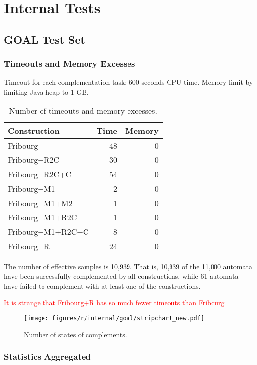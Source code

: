 \section{Internal Tests}

\subsection{GOAL Test Set}

\subsubsection{Timeouts and Memory Excesses}

Timeout for each complementation task: 600 seconds CPU time. Memory limit by limiting Java heap to 1 GB.

\begin{table}[ht]
\centering
\begin{tabular}{lrr}
  \hline
Construction & Time & Memory \\ 
  \hline
Fribourg & 48 & 0 \\ 
  Fribourg+R2C & 30 & 0 \\ 
  Fribourg+R2C+C & 54 & 0 \\ 
  Fribourg+M1 & 2 & 0 \\ 
  Fribourg+M1+M2 & 1 & 0 \\ 
  Fribourg+M1+R2C & 1 & 0 \\ 
  Fribourg+M1+R2C+C & 8 & 0 \\ 
  Fribourg+R & 24 & 0 \\ 
   \hline
\end{tabular}
\caption{Number of timeouts and memory excesses.}
\end{table}


The number of effective samples is 10,939. That is, 10,939 of the 11,000 automata have been successfully complemented by all constructions, while 61 automata have failed to complement with at least one of the constructions.

\textcolor{red}{It is strange that Fribourg+R has so much fewer timeouts than Fribourg}

\begin{figure}[ht]
\centering
\texttt{[image: figures/r/internal/goal/stripchart\_new.pdf]}
\caption{Number of states of complements.}
\end{figure}


\subsubsection{Statistics Aggregated}

